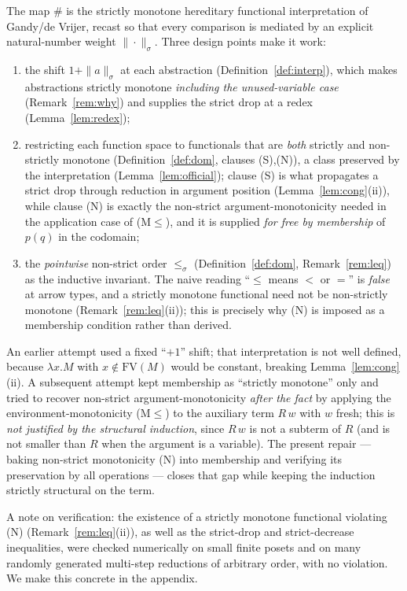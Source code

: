 \documentclass{amsart}
\theoremstyle{definition}
\newcommand{\FV}{\mathrm{FV}}
\begin{document}
The map $\#$ is the strictly monotone hereditary functional interpretation of
Gandy/de Vrijer, recast so that every comparison is mediated by an explicit natural-number
weight $\|\cdot\|_\sigma$. Three design points make it work:
\begin{enumerate}
\item the shift $1+\|a\|_\sigma$ at each abstraction (Definition~\ref{def:interp}), which
  makes abstractions strictly monotone \emph{including the unused-variable case}
  (Remark~\ref{rem:why}) and supplies the strict drop at a redex (Lemma~\ref{lem:redex});
\item restricting each function space to functionals that are \emph{both} strictly and
  non-strictly monotone (Definition~\ref{def:dom}, clauses (S),(N)), a class preserved by the
  interpretation (Lemma~\ref{lem:official}); clause (S) is what propagates a strict drop
  through reduction in argument position (Lemma~\ref{lem:cong}(ii)), while clause (N) is
  exactly the non-strict argument-monotonicity needed in the application case of (M$\le$),
  and it is supplied \emph{for free by membership} of $p(q)$ in the codomain;
\item the \emph{pointwise} non-strict order $\le_\sigma$ (Definition~\ref{def:dom},
  Remark~\ref{rem:leq}) as the inductive invariant. The naive reading ``$\le$ means $<$ or
  $=$'' is \emph{false} at arrow types, and a strictly monotone functional need not be
  non-strictly monotone (Remark~\ref{rem:leq}(ii)); this is precisely why (N) is imposed as a
  membership condition rather than derived.
\end{enumerate}
An earlier attempt used a fixed ``$+1$'' shift; that interpretation is not well defined,
because $\lambda x.M$ with $x\notin\FV(M)$ would be constant, breaking
Lemma~\ref{lem:cong}(ii). A subsequent attempt kept membership as ``strictly monotone'' only
and tried to recover non-strict argument-monotonicity \emph{after the fact} by applying the
environment-monotonicity (M$\le$) to the auxiliary term $R\,w$ with $w$ fresh; this is
\emph{not justified by the structural induction}, since $R\,w$ is not a subterm of $R$ (and
is not smaller than $R$ when the argument is a variable). The present repair --- baking
non-strict monotonicity (N) into membership and verifying its preservation by all operations
--- closes that gap while keeping the induction strictly structural on the term.

A note on verification: the existence of a strictly monotone functional violating (N)
(Remark~\ref{rem:leq}(ii)), as well as the strict-drop and strict-decrease inequalities, were
checked numerically on small finite posets and on many randomly generated multi-step
reductions of arbitrary order, with no violation. We make this concrete in the appendix.
\end{document}
